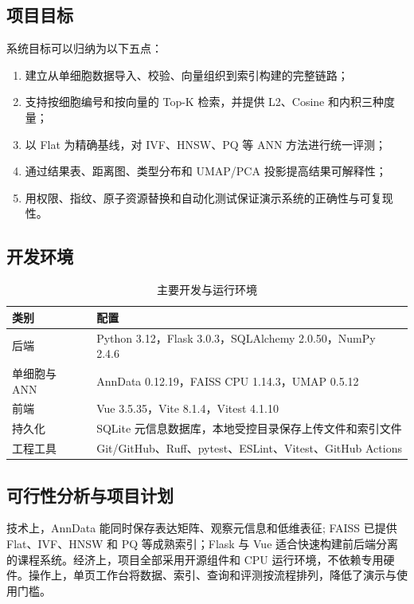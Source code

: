 \documentclass[11pt,a4paper]{article}
\begin{document}
\subsection{项目目标}

系统目标可以归纳为以下五点：

\begin{enumerate}
  \item 建立从单细胞数据导入、校验、向量组织到索引构建的完整链路；
  \item 支持按细胞编号和按向量的 Top-K 检索，并提供 L2、Cosine 和内积三种度量；
  \item 以 Flat 为精确基线，对 IVF、HNSW、PQ 等 ANN 方法进行统一评测；
  \item 通过结果表、距离图、类型分布和 UMAP/PCA 投影提高结果可解释性；
  \item 用权限、指纹、原子资源替换和自动化测试保证演示系统的正确性与可复现性。
\end{enumerate}

\subsection{开发环境}

\begin{table}[htbp]
  \centering
  \caption{主要开发与运行环境}
  \label{tab:environment}
  \begin{tabularx}{\textwidth}{p{}Y}
    \toprule
    类别 & 配置 \\
    \midrule
    后端 & Python 3.12，Flask 3.0.3，SQLAlchemy 2.0.50，NumPy 2.4.6 \\
    单细胞与 ANN & AnnData 0.12.19，FAISS CPU 1.14.3，UMAP 0.5.12 \\
    前端 & Vue 3.5.35，Vite 8.1.4，Vitest 4.1.10 \\
    持久化 & SQLite 元信息数据库，本地受控目录保存上传文件和索引文件 \\
    工程工具 & Git/GitHub、Ruff、pytest、ESLint、Vitest、GitHub Actions \\
    \bottomrule
  \end{tabularx}
\end{table}

\subsection{可行性分析与项目计划}

技术上，AnnData 能同时保存表达矩阵、观察元信息和低维表征\cite{anndata}; FAISS 已提供 Flat、IVF、HNSW 和 PQ 等成熟索引；Flask 与 Vue 适合快速构建前后端分离的课程系统。经济上，项目全部采用开源组件和 CPU 运行环境，不依赖专用硬件。操作上，单页工作台将数据、索引、查询和评测按流程排列，降低了演示与使用门槛。
\end{document}
